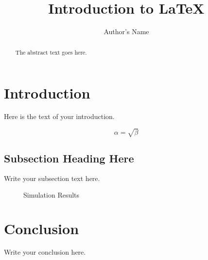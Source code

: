 \documentclass{article}
\begin{document}
    \title{Introduction to \LaTeX{}}
    \author{Author's Name}

    \maketitle

    \begin{abstract}
        The abstract text goes here.
    \end{abstract}

    \section{Introduction}
    Here is the text of your introduction.

    \begin{equation}
        \label{simple_equation}
        \alpha = \sqrt{ \beta }
    \end{equation}

    \subsection{Subsection Heading Here}
    Write your subsection text here.

    \begin{figure}
        \centering
        \caption{Simulation Results}
        \label{simulationfigure}
    \end{figure}

    \section{Conclusion}
    Write your conclusion here.
\end{document}
